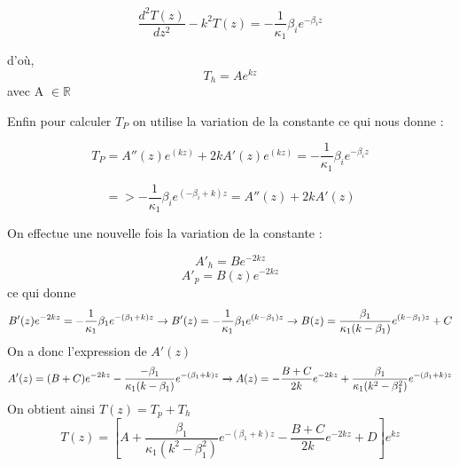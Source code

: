 \documentclass{rapportECC}
\begin{document}
\begin{equation*}
    \frac{d^2 T(z)}{d z^2} - k^2 T(z) = - \frac{1}{\kappa_1}\beta_i e^{-\beta_iz}
\end{equation*}

d'où,
\begin{equation}
    T_h = A e^{kz} 
\end{equation}
avec A $\in \mathbb{R}$

Enfin pour calculer $T_P$ on utilise la variation de la constante ce qui nous donne :

\begin{equation*}
            T_P = A''(z)e^{(kz)} + 2k A'(z)e^{(kz)} = - \frac{1}{\kappa_1}\beta_i e^{-\beta_iz} 
\end{equation*}

\begin{equation*}
            => - \frac{1}{\kappa_1}\beta_i e^{(-\beta_i + k)z} = A''(z) + 2k A'(z)
\end{equation*}

On effectue une nouvelle fois la variation de la constante :

\begin{equation*}
    A'_h = B e^{-2kz}
\end{equation*}
\begin{equation*}
    A'_p = B(z) e^{-2kz}
\end{equation*}
ce qui donne
\begin{equation*}
   B'(z)e^{-2kz} = -\frac{1}{\kappa_1}\beta_1 e^{-(\beta_1+k)z}\\
   \xrightarrow{} B'(z) = -\frac{1}{\kappa_1}\beta_1 e^{(k-\beta_1)z}
   \xrightarrow{} B(z) = \frac{\beta_1}{\kappa_1(k-\beta_1)}e^{(k-\beta_1)z} + C
\end{equation*}
On a donc l'expression de $A'(z)$
\begin{equation*}
   A'(z)=(B+C)e^{-2kz} -\frac{-\beta_1}{\kappa_1(k-\beta_1)} e^{-(\beta_1+k)z}\\
   \xrightarrow{} A(z) = -\frac{B+C}{2k}e^{-2kz}+\frac{\beta_1}{\kappa_1(k^2-\beta_1^2)} e^{-(\beta_1+k)z}
\end{equation*}
On obtient ainsi $T(z) = T_p + T_h$
\begin{equation*}
            T(z) = \left[A+\frac{\beta_1}{\kappa_1(k^2-\beta_1^2)}e^{-(\beta_1+k)z}-\frac{B+C}{2k}e^{-2kz}+D\right]e^{kz} 
\end{equation*}
\end{document}
